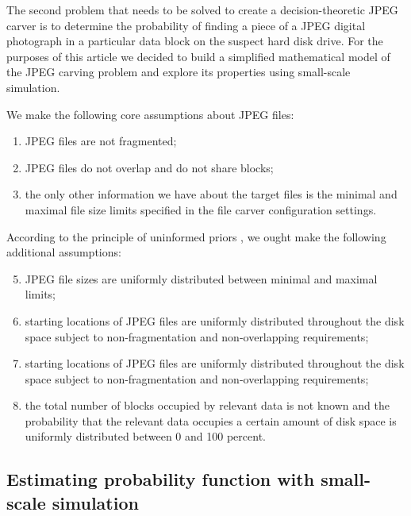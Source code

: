 \documentclass[final,5p,times,twocolumn,authoryear]{elsarticle}
\begin{document}
The second problem that needs to be solved to create a decision-theoretic JPEG carver is to determine the probability of finding a piece of a JPEG digital photograph in a particular data block on the suspect hard disk drive. For the purposes of this article we decided to build a simplified mathematical model of the JPEG carving problem and explore its properties using small-scale simulation. 

We make the following core assumptions about JPEG files:

\begin{enumerate}
\item{JPEG files are not fragmented;}
\item{JPEG files do not overlap and do not share blocks;}
\item{the only other information we have about the target files is the minimal and maximal file size limits specified in the file carver configuration settings.} 
\end{enumerate}

According to the principle of uninformed priors \citep{jaynes2003probability}, we ought make the following additional assumptions:

\begin{enumerate}
\setcounter{enumi}{4}
\item{JPEG file sizes are uniformly distributed between minimal and maximal limits;}
\item{starting locations of JPEG files are uniformly distributed throughout the disk space subject to non-fragmentation and non-overlapping requirements;}
\item{starting locations of JPEG files are uniformly distributed throughout the disk space subject to non-fragmentation and non-overlapping requirements;}
\item{the total number of blocks occupied by relevant data is not known and the probability that the relevant data occupies a certain amount of disk space is uniformly distributed between 0 and 100 percent.}
\end{enumerate}

\subsection{Estimating probability function with small-scale simulation}
\end{document}
